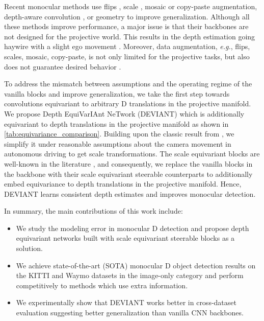 \documentclass[runningheads]{llncs}
\newcommand{\threeD}{D}
\newcommand{\equivariant} {equivariant}
\newcommand{\equivariance}{equivariance}
\newcommand{\scaleEquivariant} {scale \equivariant}
\newcommand{\depthEquivariant} {depth \equivariant}
\newcommand{\manifold}{manifold}
\newcommand{\kitti}{KITTI}
\newcommand{\waymo}{Waymo}
\newcommand{\imageOnly}{image-only}
\newcommand{\sota}{SOTA}
\newcommand{\forExample}{\textit{e.g.}}
\newcommand{\methodName}{DEVIANT}
\newcommand{\methodNameFull}{Depth EquiVarIAnt NeTwork}
\begin{document}
    Recent monocular methods use flips \cite{brazil2019m3d}, scale \cite{simonelli2020towards, lu2021geometry}, mosaic \cite{bochkovskiy2020yolov4, sugirtha2021exploring} or copy-paste \cite{lian2021geometry} augmentation, depth-aware convolution \cite{brazil2019m3d}, or geometry \cite{liu2021ground, lu2021geometry, shi2021geometry, zhang2021learning} to improve generalization. 
    Although all these methods improve performance, a major issue is that their backbones are not designed for the projective world. 
    This results in the depth estimation going haywire with a slight ego movement \cite{zhou2021monoef}. 
    Moreover, data augmentation, \forExample, flips, scales, mosaic, copy-paste, is not only limited for the projective tasks, but also does not guarantee desired behavior \cite{gandikota2021training}.
        
    To address the mismatch between assumptions and the operating regime of the vanilla blocks and improve generalization, we take the first step towards convolutions \equivariant{} to arbitrary \threeD{} translations in the projective manifold. 
    We propose \methodNameFull{} (\methodName)
    which is additionally equivariant to depth translations in the projective \manifold{} as shown in \cref{tab:equivariance_comparison}.
    Building upon the classic result from \cite{hartley2003multiple}, we simplify it under reasonable assumptions about the camera movement in autonomous driving to get scale transformations.
    The \scaleEquivariant{} blocks are well-known in the literature \cite{ghosh2019scale, zhu2019scale, sosnovik2020sesn, jansson2021scale}, and consequently, we replace the vanilla blocks in the backbone with their \scaleEquivariant{} steerable counterparts \cite{sosnovik2020sesn} to additionally embed \equivariance{} to depth translations in the projective \manifold. 
Hence, \methodName{} learns consistent depth estimates and improves monocular detection.

    In summary, the main contributions of this work include:
    \begin{itemize}
        \item We study the modeling error in monocular \threeD{} detection  and propose \depthEquivariant{} networks built with \scaleEquivariant{} steerable blocks as a solution.
        \item We achieve state-of-the-art (\sota) monocular \threeD{} object detection results on the \kitti{} and \waymo{} datasets in the \imageOnly{} category and perform competitively to methods which use extra information.
        \item  We experimentally show that \methodName{} works better in cross-dataset evaluation suggesting better generalization than vanilla CNN backbones.
    \end{itemize}
\end{document}
